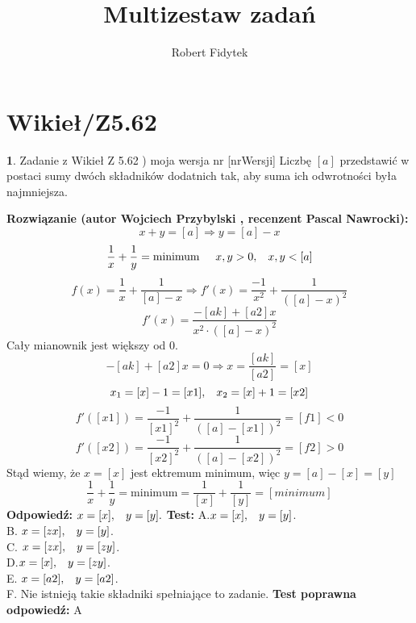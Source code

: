 \documentclass[12pt, a4paper]{article}
\title{Multizestaw zadań}
\author{Robert Fidytek}
\date{}
\theoremstyle{definition} %
\newtheorem{zad}{}
\newcommand{\kategoria}[1]{\section{#1}} %
\newcommand{\zadStart}[1]{\begin{zad}#1\newline} %
\newcommand{\zadStop}{\end{zad}}   %
\newcommand{\rozwStart}[2]{\noindent \textbf{Rozwiązanie (autor #1 , recenzent #2): }\newline} %
\newcommand{\rozwStop}{\newline}                                            %
\newcommand{\odpStart}{\noindent \textbf{Odpowiedź:}\newline}    %
\newcommand{\odpStop}{\newline}                                             %
\newcommand{\testStart}{\noindent \textbf{Test:}\newline} %
\newcommand{\testStop}{\newline} %
\newcommand{\kluczStart}{\noindent \textbf{Test poprawna odpowiedź:}\newline} %
\newcommand{\kluczStop}{\newline} %
\begin{document}
\maketitle


\kategoria{Wikieł/Z5.62}
\zadStart{Zadanie z Wikieł Z 5.62 ) moja wersja nr [nrWersji]}
Liczbę $[a]$ przedstawić w postaci sumy dwóch składników dodatnich tak, aby suma ich odwrotności była najmniejsza.
\zadStop
\rozwStart{Wojciech Przybylski}{Pascal Nawrocki}
$$x+y=[a] \Rightarrow y=[a]-x$$
$$\frac{1}{x}+\frac{1}{y}=\mbox{minimum}\hspace{5mm} x,y>0,\hspace{3mm}x,y<[a]$$
$$f(x)=\frac{1}{x}+\frac{1}{[a]-x} \Rightarrow f'(x)=\frac{-1}{x^{2}}+\frac{1}{([a]-x)^{2}}$$
$$f'(x)=\frac{-[ak]+[a2]x}{x^{2}\cdot([a]-x)^{2}}$$
Cały mianownik jest większy od 0.
$$-[ak]+[a2]x=0 \Rightarrow x=\frac{[ak]}{[a2]}=[x]$$
$$x_{1}=[x]-1=[x1], \hspace{3mm} x_{2}=[x]+1=[x2]$$
$$f'([x1])=\frac{-1}{[x1]^{2}}+\frac{1}{([a]-[x1])^{2}}=[f1]<0$$
$$f'([x2])=\frac{-1}{[x2]^{2}}+\frac{1}{([a]-[x2])^{2}}=[f2]>0$$
Stąd wiemy, że $x=[x]$ jest ektremum minimum, więc $y=[a]-[x]=[y]$
$$\frac{1}{x}+\frac{1}{y}=\mbox{minimum}=\frac{1}{[x]}+\frac{1}{[y]}=[minimum]$$
\rozwStop
\odpStart
$x=[x], \hspace{3mm} y=[y].$
\odpStop
\testStart
A.$x=[x], \hspace{3mm} y=[y]$.\\
B. $x=[zx], \hspace{3mm} y=[y]$.\\
C. $x=[zx], \hspace{3mm} y=[zy]$.\\
D.$x=[x], \hspace{3mm} y=[zy]$.\\
E. $x=[a2], \hspace{3mm} y=[a2]$.\\
F. Nie istnieją takie składniki spełniające to zadanie.
\testStop
\kluczStart
A
\kluczStop
\end{document}
